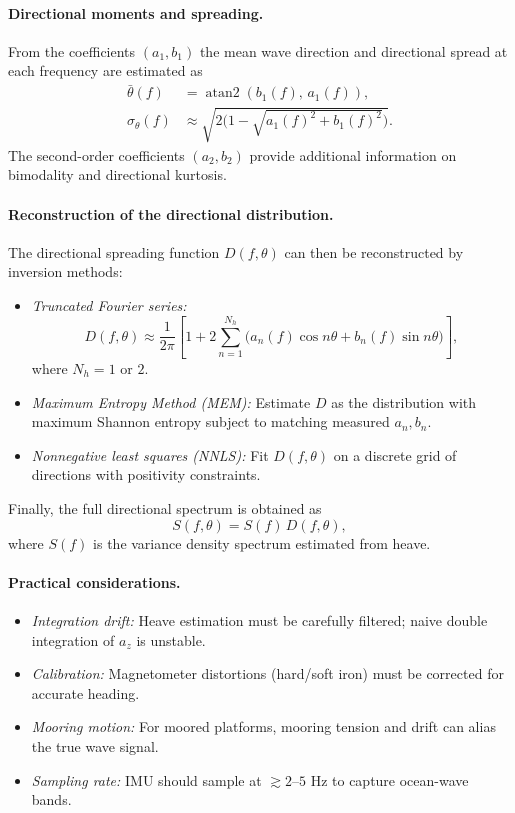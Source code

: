 \documentclass[11pt]{article}
\begin{document}
\paragraph{Directional moments and spreading.}
From the coefficients $(a_1,b_1)$ the mean wave direction and directional spread at each frequency are estimated as
\begin{align}
\bar{\theta}(f) &= \operatorname{atan2}(b_1(f),\,a_1(f)), \\
\sigma_\theta(f) &\approx \sqrt{2\Big(1 - \sqrt{a_1(f)^2 + b_1(f)^2}\Big)}.
\end{align}
The second-order coefficients $(a_2,b_2)$ provide additional information on bimodality and directional kurtosis.

\paragraph{Reconstruction of the directional distribution.}
The directional spreading function $D(f,\theta)$ can then be reconstructed by inversion methods:
\begin{itemize}
  \item \emph{Truncated Fourier series:}
  \begin{equation}
  D(f,\theta) \approx \frac{1}{2\pi}\left[1 + 2\sum_{n=1}^{N_h}\big(a_n(f)\cos n\theta + b_n(f)\sin n\theta\big)\right],
  \end{equation}
  where $N_h=1$ or $2$.
  \item \emph{Maximum Entropy Method (MEM):} Estimate $D$ as the distribution with maximum Shannon entropy subject to matching measured $a_n,b_n$.
  \item \emph{Nonnegative least squares (NNLS):} Fit $D(f,\theta)$ on a discrete grid of directions with positivity constraints.
\end{itemize}
Finally, the full directional spectrum is obtained as
\begin{equation}
S(f,\theta) = S(f)\, D(f,\theta),
\end{equation}
where $S(f)$ is the variance density spectrum estimated from heave.

\paragraph{Practical considerations.}
\begin{itemize}
  \item \emph{Integration drift:} Heave estimation must be carefully filtered; naive double integration of $a_z$ is unstable.
  \item \emph{Calibration:} Magnetometer distortions (hard/soft iron) must be corrected for accurate heading.
  \item \emph{Mooring motion:} For moored platforms, mooring tension and drift can alias the true wave signal.
  \item \emph{Sampling rate:} IMU should sample at $\gtrsim 2$--$5$ Hz to capture ocean-wave bands.
\end{itemize}
\end{document}
